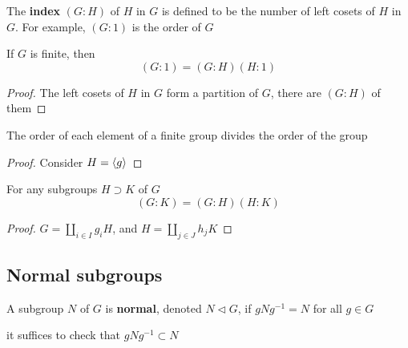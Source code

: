 \documentclass[11pt]{article}
\begin{document}
The \textbf{index} \((G:H)\) of \(H\) in \(G\) is defined to be the number of left cosets of \(H\)
in \(G\). For example, \((G:1)\) is the order of \(G\)

\begin{theorem}[Lagrange]
If \(G\) is finite, then
\begin{equation*}
(G:1)=(G:H)(H:1)
\end{equation*}
\end{theorem}

\begin{proof}
The left cosets of \(H\) in \(G\) form a partition of \(G\), there are \((G:H)\) of them
\end{proof}

\begin{corollary}[]
The order of each element of a finite group divides the order of the group
\end{corollary}

\begin{proof}
Consider \(H=\langle g\rangle\)
\end{proof}

\begin{proposition}[]
For any subgroups \(H\supset K\) of \(G\)
\begin{equation*}
(G:K)=(G:H)(H:K)
\end{equation*}
\end{proposition}

\begin{proof}
\(G=\coprod_{i\in I}g_iH\), and \(H=\coprod_{j\in J}h_jK\)
\end{proof}
\subsection{Normal subgroups}
\label{sec:org6d6fe65}
A subgroup \(N\) of \(G\) is \textbf{normal}, denoted \(N\lhd G\), if \(gNg^{-1}=N\) for all \(g\in G\)

it suffices to check that \(gNg^{-1}\subset N\)
\end{document}
